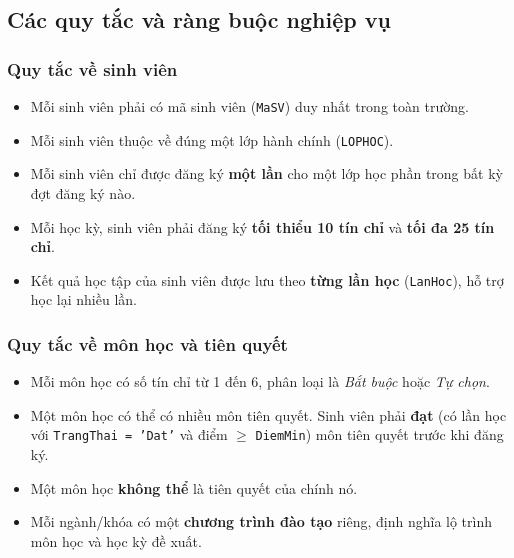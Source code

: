 \documentclass[13pt, a4paper]{article}
\begin{document}
\subsection{Các quy tắc và ràng buộc nghiệp vụ}

\subsubsection{Quy tắc về sinh viên}
\begin{itemize}[leftmargin=1.5cm]
  \item Mỗi sinh viên phải có mã sinh viên (\texttt{MaSV}) duy nhất trong toàn trường.
  \item Mỗi sinh viên thuộc về đúng một lớp hành chính (\texttt{LOPHOC}).
  \item Mỗi sinh viên chỉ được đăng ký \textbf{một lần} cho một lớp học phần trong bất kỳ đợt đăng ký nào.
  \item Mỗi học kỳ, sinh viên phải đăng ký \textbf{tối thiểu 10 tín chỉ} và \textbf{tối đa 25 tín chỉ}.
  \item Kết quả học tập của sinh viên được lưu theo \textbf{từng lần học} (\texttt{LanHoc}), hỗ trợ học lại nhiều lần.
\end{itemize}

\subsubsection{Quy tắc về môn học và tiên quyết}
\begin{itemize}[leftmargin=1.5cm]
  \item Mỗi môn học có số tín chỉ từ 1 đến 6, phân loại là \emph{Bắt buộc} hoặc \emph{Tự chọn}.
  \item Một môn học có thể có nhiều môn tiên quyết. Sinh viên phải \textbf{đạt} (có lần học với \texttt{TrangThai = 'Dat'} và điểm $\geq$ \texttt{DiemMin}) môn tiên quyết trước khi đăng ký.
  \item Một môn học \textbf{không thể} là tiên quyết của chính nó.
  \item Mỗi ngành/khóa có một \textbf{chương trình đào tạo} riêng, định nghĩa lộ trình môn học và học kỳ đề xuất.
\end{itemize}
\end{document}
